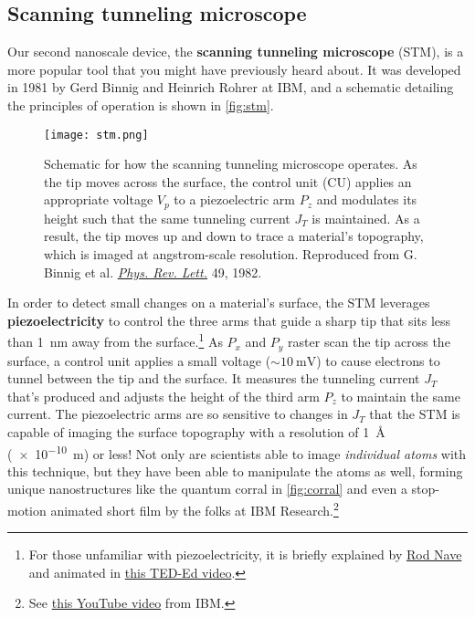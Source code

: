 \subsection{Scanning tunneling microscope}

Our second nanoscale device, the \textbf{scanning tunneling microscope} (STM), is a more popular tool that you might have previously heard about. 
It was developed in 1981 by Gerd Binnig and Heinrich Rohrer at IBM, and a schematic detailing the principles of operation is shown in \autoref{fig:stm}.

\begin{figure}[!h]
	\centering
	\texttt{[image: stm.png]}
	\caption{Schematic for how the scanning tunneling microscope operates. 
	As the tip moves across the surface, the control unit (CU) applies an appropriate voltage $V_p$ to a piezoelectric arm $P_z$ and modulates its height such that the same tunneling current $J_T$ is maintained. 
	As a result, the tip moves up and down to trace a material's topography, which is imaged at angstrom-scale resolution. 
	Reproduced from G. Binnig et al. \href{https://journals.aps.org/prl/abstract/10.1103/PhysRevLett.49.57}{\emph{Phys. Rev. Lett.}} 49, 1982.}
	\label{fig:stm}
\end{figure}

In order to detect small changes on a material's surface, the STM leverages \textbf{piezoelectricity} to control the three arms that guide a sharp tip that sits less than \SI{1}{\nano\meter} away from the surface.\footnote{For those unfamiliar with piezoelectricity, it is briefly explained by \href{http://hyperphysics.phy-astr.gsu.edu/hbase/Solids/piezo.html}{Rod Nave} and animated in \href{https://www.youtube.com/watch?v=YEJ2qryXcIQ}{this TED-Ed video}.} 
As $P_x$ and $P_y$ raster scan the tip across the surface, a control unit applies a small voltage ($\sim\SI{10}{\milli\volt}$) to cause electrons to tunnel between the tip and the surface. 
It measures the tunneling current $J_T$ that's produced and adjusts the height of the third arm $P_z$ to maintain the same current. 
The piezoelectric arms are so sensitive to changes in $J_T$ that the STM is capable of imaging the surface topography with a resolution of \SI{1}{\angstrom} (\SI{e-10}{\meter}) or less! 
Not only are scientists able to image \emph{individual atoms} with this technique, but they have been able to manipulate the atoms as well, forming unique nanostructures like the quantum corral in \autoref{fig:corral} and even a stop-motion animated short film by the folks at IBM Research.\footnote{See  \href{https://www.youtube.com/watch?v=oSCX78-8-q0}{this YouTube video} from IBM.}

